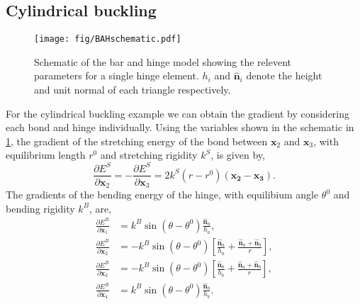 \documentclass[aps,physrev,10pt]{revtex4-2}
\begin{document}
\subsection{Cylindrical buckling}
\begin{figure}[htb]
  \texttt{[image: fig/BAHschematic.pdf]}
  \caption{\label{fig:BAHschematic}
    Schematic of the bar and hinge model showing the relevent parameters for a single hinge element. $h_i$ and $\bm{\hat{n}}_i$ denote the height and unit normal of each triangle respectively.
  }
\end{figure}
For the cylindrical buckling example we can obtain the gradient by considering each bond and hinge individually.
Using the variables shown in the schematic in \cref{fig:BAHschematic}, the gradient of the stretching energy of the bond between $\bm{x}_2$ and $\bm{x}_3$, with equilibrium length $r^0$ and stretching rigidity $k^S$, is given by,
\begin{equation}
  \frac{\partial E^S}{\partial \bm{x}_2} = - \frac{\partial E^S}{\partial \bm{x}_3} = 
    2 k^S (r - r^0) (\bm{x_2} - \bm{x_3}).
\end{equation}
The gradients of the bending energy of the hinge, with equilibium angle $\theta^0$ and bending rigidity $k^B$, are,
\begin{align}
  \frac{\partial E^B}{\partial \bm{x}_1} &= k^B \sin(\theta - \theta^0) \frac{\bm{\hat{n}}_a}{h_a}, \\
  \frac{\partial E^B}{\partial \bm{x}_2} &= - k^B \sin(\theta - \theta^0) \left[\frac{\bm{\hat{n}}_a}{h_a} + \frac{\bm{\hat{n}}_a + \bm{\hat{n}}_b}{r}\right], \\
  \frac{\partial E^B}{\partial \bm{x}_3} &= - k^B \sin(\theta - \theta^0) \left[\frac{\bm{\hat{n}}_b}{h_b} + \frac{\bm{\hat{n}}_a + \bm{\hat{n}}_b}{r}\right], \\
  \frac{\partial E^B}{\partial \bm{x}_4} &= k^B \sin(\theta - \theta^0) \frac{\bm{\hat{n}}_b}{h_b}.
\end{align}
\end{document}
